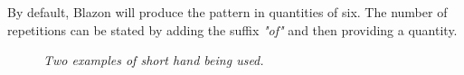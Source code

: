 By default, Blazon will produce the pattern in quantities of six.  The number of repetitions can be stated by adding the suffix \emph{"of"} and then providing a quantity.  

\begin{figure}[H]
\hfill
{}
\hfill

\caption{\emph{Two examples of short hand being used.}}

\end{figure}





